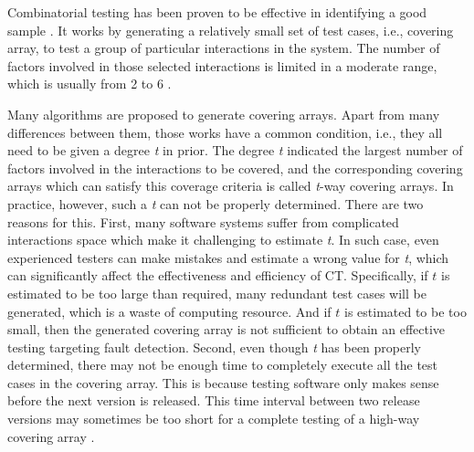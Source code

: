 \documentclass[conference]{IEEEtran}
\theoremstyle{definition}
\begin{document}
Combinatorial testing has been proven to be effective in identifying a good sample \cite{nie2011survey}. It works by generating a relatively small set of test cases, i.e., covering array, to test a group of particular interactions in the system. The number of factors involved in those selected interactions is limited in a moderate range, which is usually from 2 to 6 \cite{kuhn2002investigation}.


Many algorithms are proposed to generate covering arrays. Apart from many differences between them,  those works have a common condition, i.e., they all need to be given a degree \emph{t} in prior.  The degree \emph{t} indicated the largest number of factors involved in the interactions to be covered, and the corresponding covering arrays which can satisfy this coverage criteria is called \emph{t}-way covering arrays. In practice, however, such a \emph{t} can not be properly determined. There are two reasons for this. First, many software systems suffer from complicated interactions space which make it challenging to estimate \emph{t}. In such case, even experienced testers can make mistakes and estimate a wrong value for \emph{t}, which can significantly affect the effectiveness and efficiency of CT. Specifically, if $t$ is estimated to be too large than required, many redundant test cases will be generated, which is a waste of computing resource. And if $t$ is estimated to be too small, then the generated covering array is not sufficient to obtain an effective testing targeting fault detection. Second, even though \emph{t} has been properly determined, there may not be enough time to completely execute all the test cases in the covering array. This is because testing software only makes sense before the next version is released. This time interval between two release versions may sometimes be too short for a complete testing of a high-way covering array \cite{fouche2009incremental}.

\end{document}
